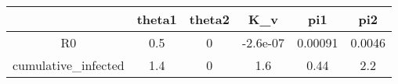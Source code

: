 \begin{tabular}{|c|c|c|c|c|c|}
\hline
& theta1 & theta2 & K_v & pi1 & pi2 \\
\hline
R0 & 0.5 & 0 & -2.6e-07 & 0.00091 & 0.0046 \\
\hline
cumulative_infected & 1.4 & 0 & 1.6 & 0.44 & 2.2 \\
\hline
\end{tabular}
